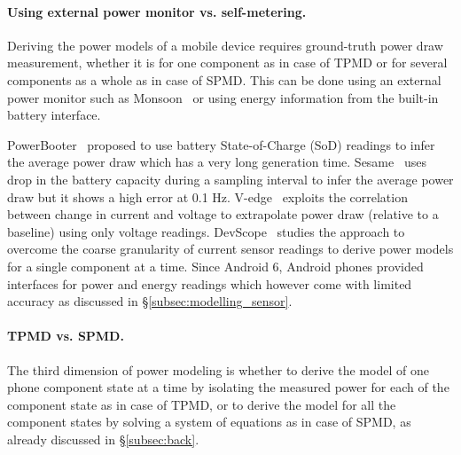 \paragraph{Using external power monitor vs. self-metering.}
Deriving the power models of a mobile device 
requires ground-truth power draw measurement, whether it is for one component as in case of TPMD or for several components as a whole as in case of SPMD. This can be done using an external power monitor such as Monsoon~\cite{powermonitor} or
using energy information from the built-in battery interface. 

PowerBooter~\cite{powerbooter:2010} proposed to use battery
State-of-Charge (SoD) readings to infer the average power draw which has a
very long generation time.
%
Sesame~\cite{sesame:2011} uses drop in the battery capacity during a
sampling interval to infer the average power draw but it shows a high
error at 0.1 Hz.
% 
V-edge~\cite{vedge:2013} exploits the correlation between change in
current and voltage to extrapolate power draw (relative to a baseline)
using only voltage readings.  DevScope~\cite{devscope:2012} studies
the approach to overcome the coarse granularity of current sensor
readings to derive power models for a single component at a time.
%
Since Android 6, Android phones provided interfaces for power and
energy readings which however come with limited accuracy as discussed
in \S\ref{subsec:modelling_sensor}.



\paragraph{TPMD vs. SPMD.}
The third dimension of power modeling is whether to derive the model of one phone component state at a time by isolating the measured power for each of the component state as in case of TPMD, or 
to derive the model for all the component states by solving a system of equations as in case of SPMD, as already discussed in \S\ref{subsec:back}.
